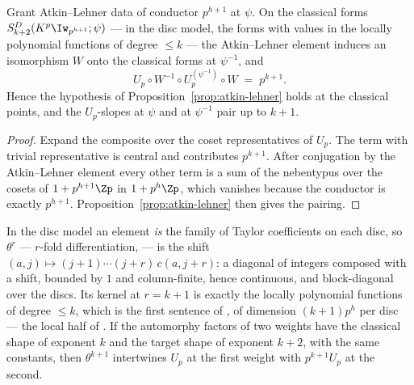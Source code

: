 \begin{proposition}
  \label{prop:al-identity}
  \leanok
  Grant Atkin--Lehner data of conductor $p^{h+1}$ at $\psi$.  On the classical forms
  $S^{D}_{k+2}(K^{p}\Iw_{p^{h+1}};\psi)$ --- in the disc model, the forms with values in the
  locally polynomial functions of degree $\leq k$ --- the Atkin--Lehner element induces an
  isomorphism $W$ onto the classical forms at $\psi^{-1}$, and
  \[
    U_p \circ W^{-1} \circ U_p^{(\psi^{-1})} \circ W \;=\; p^{k+1} .
  \]
  Hence the hypothesis of Proposition~\ref{prop:atkin-lehner} holds at the classical points, and
  the $U_p$-slopes at $\psi$ and at $\psi^{-1}$ pair up to $k+1$.
\end{proposition}

\begin{proof}
  \leanok
  Expand the composite over the coset representatives of $U_p$.  The term with trivial
  representative is central and contributes $p^{k+1}$.  After conjugation by the Atkin--Lehner
  element every other term is a sum of the nebentypus over the cosets of $1 + p^{h+1}\Zp$ in
  $1 + p^{h}\Zp$, which vanishes because the conductor is exactly $p^{h+1}$.
  Proposition~\ref{prop:atkin-lehner} then gives the pairing.
\end{proof}

\begin{proposition}
  \label{prop:theta}
  \leanok
  In the disc model an element \emph{is} the family of Taylor coefficients on each disc, so
  $\theta^{r}$ --- $r$-fold differentiation, \cite[\S7]{Bu04} --- is the shift
  $(a,j)\mapsto (j+1)\cdots(j+r)\,c(a,j+r)$: a diagonal of integers composed with a shift,
  bounded by $1$ and column-finite, hence continuous, and block-diagonal over the discs.  Its
  kernel at $r = k+1$ is exactly the locally polynomial functions of degree $\leq k$, which is
  the first sentence of \cite[Proposition 4]{Bu04}, of dimension $(k+1)p^{h}$ per disc --- the
  local half of \cite[(3.21.1)]{LWX}.  If the automorphy factors of two weights have the classical
  shape of exponent $k$ and the target shape of exponent $k+2$, with the same constants, then
  $\theta^{k+1}$ intertwines $U_p$ at the first weight with $p^{k+1}U_p$ at the second.
\end{proposition}

